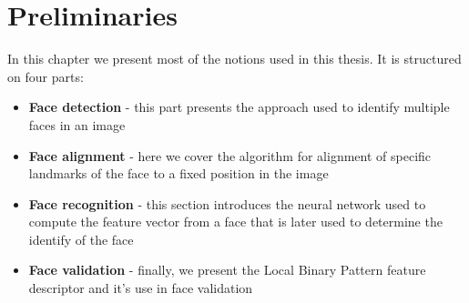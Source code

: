 \chapter{Preliminaries}

In this chapter we present most of the notions used in this thesis. It is structured on four parts:
\begin{itemize}
	\item \textbf{Face detection} - this part presents the approach used to identify multiple faces in an image
	\item \textbf{Face alignment} - here we cover the algorithm for alignment of specific landmarks of the face to a fixed position in the image
	\item \textbf{Face recognition} - this section introduces the neural network used to compute the feature vector from a face that is later used to determine the identify of the face
	\item \textbf{Face validation} - finally, we present the Local Binary Pattern feature descriptor and it's use in face validation
\end{itemize}